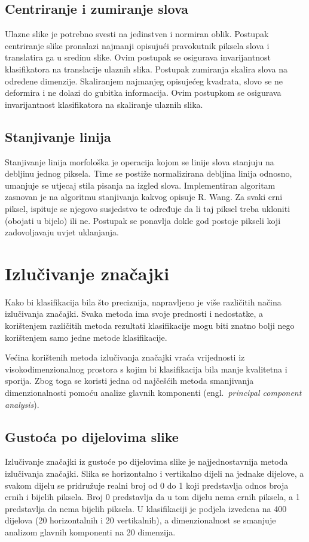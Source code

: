 \documentclass[a4paper,twocolumn,dvipdfm]{article}
\begin{document}
\subsection{Centriranje i zumiranje slova}
Ulazne slike je potrebno svesti na jedinstven i normiran oblik. Postupak 
centriranje slike pronalazi najmanji opisujući pravokutnik piksela slova  
i translatira ga u sredinu slike. Ovim postupak se osigurava invarijantnost
klasifikatora na translacije ulaznih slika. Postupak zumiranja skalira slova 
na određene dimenzije. Skaliranjem najmanjeg opisujećeg kvadrata, slovo se 
ne deformira i ne dolazi do gubitka informacija. Ovim postupkom se osigurava 
invarijantnost klasifikatora na skaliranje ulaznih slika.

\subsection{Stanjivanje linija}
Stanjivanje linija morfološka je operacija kojom se linije slova stanjuju na
debljinu jednog piksela. Time se postiže normalizirana debljina linija odnosno,
umanjuje se utjecaj stila pisanja na izgled slova. Implementiran algoritam
zasnovan je na algoritmu stanjivanja kakvog opisuje R.
Wang\cite{Wang2004Online}. Za svaki crni piksel, ispituje se njegovo susjedstvo
te određuje da li taj piksel treba ukloniti (obojati u bijelo) ili ne. Postupak
se ponavlja dokle god postoje pikseli koji zadovoljavaju uvjet uklanjanja.

\section{Izlučivanje značajki}
Kako bi klasifikacija bila što preciznija, napravljeno je više različitih načina
izlučivanja značajki. Svaka metoda ima svoje prednosti i nedostatke, a
korištenjem različitih metoda rezultati klasifikacije mogu biti znatno bolji
nego korištenjem samo jedne metode klasifikacije.

Većina korištenih metoda izlučivanja značajki vraća vrijednosti iz
visokodimenzionalnog prostora s kojim bi klasifikacija bila manje kvalitetna i
sporija. Zbog toga se koristi jedna od najčešćih metoda smanjivanja
dimenzionalnosti pomoću analize glavnih komponenti (engl.\ \emph{principal
component analysis}).

\subsection{Gustoća po dijelovima slike}
Izlučivanje značajki iz gustoće po dijelovima slike je najjednostavnija metoda
izlučivanja značajki. Slika se horizontalno i vertikalno dijeli na jednake
dijelove, a svakom dijelu se pridružuje realni broj od 0 do 1 koji predstavlja
odnos broja crnih i bijelih piksela. Broj 0 predstavlja da u tom dijelu nema
crnih piksela, a 1 predstavlja da nema bijelih piksela. U klasifikaciji je
podjela izvedena na 400 dijelova (20 horizontalnih i 20 vertikalnih), a
dimenzionalnost se smanjuje analizom glavnih komponenti na 20 dimenzija.
\end{document}
